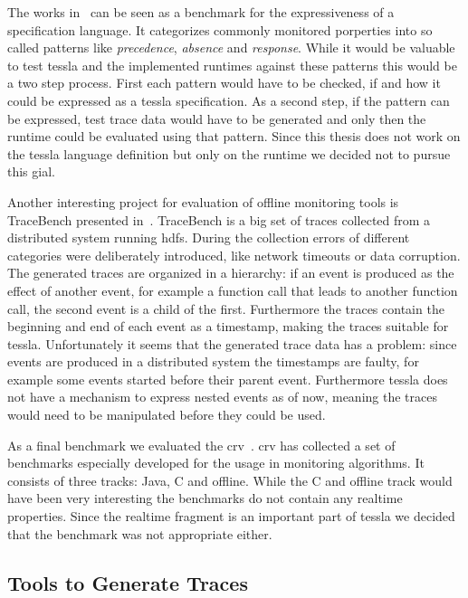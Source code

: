 The works in~\cite{Dwyer1999} can be seen as a benchmark for the expressiveness of a specification language.
It categorizes commonly monitored porperties into so called patterns like \emph{precedence}, \emph{absence} and \emph{response}.
While it would be valuable to test \gls{tessla} and the implemented runtimes against these patterns this would be a two step process.
First each pattern would have to be checked, if and how it could be expressed as a \gls{tessla} specification.
As a second step, if the pattern can be expressed, test trace data would have to be generated and only then the runtime could be evaluated using that pattern.
Since this thesis does not work on the \gls{tessla} language definition but only on the runtime we decided not to pursue this gial.

Another interesting project for evaluation of offline monitoring tools is TraceBench presented in~\cite{Zhou2014}.
TraceBench is a big set of traces collected from a distributed system running \gls{hdfs}.
During the collection errors of different categories were deliberately introduced, like network timeouts or data corruption.
The generated traces are organized in a hierarchy: if an event is produced as the effect of another event, for example a function call that leads to another function call, the second event is a child of the first.
Furthermore the traces contain the beginning and end of each event as a timestamp, making the traces suitable for \gls{tessla}.
Unfortunately it seems that the generated trace data has a problem: since events are produced in a distributed system the timestamps are faulty, for example some events started before their parent event.
Furthermore \gls{tessla} does not have a mechanism to express nested events as of now, meaning the traces would need to be manipulated before they could be used.

As a final benchmark we evaluated the \gls{crv}~\citep{Reger2016}.
\Gls{crv} has collected a set of benchmarks especially developed for the usage in monitoring algorithms.
It consists of three tracks: Java, C and offline.
While the C and offline track would have been very interesting the benchmarks do not contain any realtime properties.
Since the realtime fragment is an important part of \gls{tessla} we decided that the benchmark was not appropriate either.

\subsection{Tools to Generate Traces}

